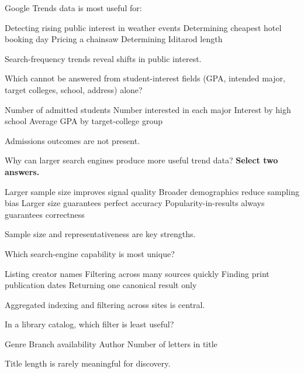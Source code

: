 \question[5]
Google Trends data is most useful for:
\begin{choices}
  \CorrectChoice Detecting rising public interest in weather events
  \choice Determining cheapest hotel booking day
  \choice Pricing a chainsaw
  \choice Determining Iditarod length
\end{choices}
\begin{solution}
  Search-frequency trends reveal shifts in public interest.
\end{solution}

\question[5]
Which cannot be answered from student-interest fields (GPA, intended major, target colleges, school, address) alone?
\begin{choices}
  \CorrectChoice Number of admitted students
  \choice Number interested in each major
  \choice Interest by high school
  \choice Average GPA by target-college group
\end{choices}
\begin{solution}
  Admissions outcomes are not present.
\end{solution}


\question[5]
Why can larger search engines produce more useful trend data? \textbf{Select two answers.}
\begin{checkboxes}
  \CorrectChoice Larger sample size improves signal quality
  \CorrectChoice Broader demographics reduce sampling bias
  \choice Larger size guarantees perfect accuracy
  \choice Popularity-in-results always guarantees correctness
\end{checkboxes}
\begin{solution}
  Sample size and representativeness are key strengths.
\end{solution}

\question[5]
Which search-engine capability is most unique?
\begin{choices}
  \choice Listing creator names
  \CorrectChoice Filtering across many sources quickly
  \choice Finding print publication dates
  \choice Returning one canonical result only
\end{choices}
\begin{solution}
  Aggregated indexing and filtering across sites is central.
\end{solution}

\newpage 

\question[5]
In a library catalog, which filter is least useful?
\begin{choices}
  \choice Genre
  \choice Branch availability
  \choice Author
  \CorrectChoice Number of letters in title
\end{choices}
\begin{solution}
  Title length is rarely meaningful for discovery.
\end{solution}


